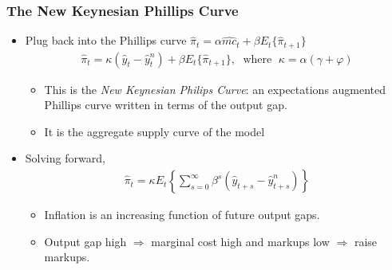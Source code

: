 \documentclass[11pt,aspectratio=169,xcolor={dvipsnames},hyperref={pdftex,pdfpagemode=UseNone,hidelinks,pdfdisplaydoctitle=true},usepdftitle=false]{beamer}
\begin{document}
%


\begin{frame}
\frametitle{The New Keynesian Phillips Curve
}
\begin{itemize}
	\item Plug back into the Phillips curve $\hat{\pi}_t=\alpha\hat{mc}_{t}+\beta E_t\{\hat{\pi}_{t+1}\}$
	\begin{align*}
		\hat{\pi}_t=\kappa(\hat{y}_t-\hat{y}_t^{n})+\beta E_t\{\hat{\pi}_{t+1}\},\;\text{ where }\;\kappa=\alpha(\gamma+\varphi)
\end{align*}
	\begin{itemize}
		\item This is the \emph{New Keynesian Philips Curve}: an expectations augmented Phillips curve written in terms of the output gap.
		\item It is the aggregate supply curve of the model
	\end{itemize}
	\item Solving forward,
	\begin{align*}
		\hat{\pi}_t=\kappa E_t\left\{\sum_{s=0}^{\infty}\beta^s(\hat{y}_{t+s}-\hat{y}_{t+s}^{n})\right\}
	\end{align*}
	\begin{itemize}
		\item Inflation is an increasing function of future output gaps.
		\item Output gap high $\Rightarrow$ marginal cost high and markups low $\Rightarrow$ raise markups.
	\end{itemize}
\end{itemize}
\end{frame}
\end{document}
